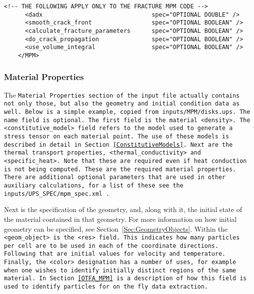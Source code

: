 \begin{Verbatim}[fontsize=\footnotesize]
      <!-- THE FOLLOWING APPLY ONLY TO THE FRACTURE MPM CODE -->
      <dadx                               spec="OPTIONAL DOUBLE" />
      <smooth_crack_front                 spec="OPTIONAL BOOLEAN" />
      <calculate_fracture_parameters      spec="OPTIONAL BOOLEAN" />
      <do_crack_propagation               spec="OPTIONAL BOOLEAN" />
      <use_volume_integral                spec="OPTIONAL BOOLEAN" />
    </MPM>
\end{Verbatim}



\subsubsection{Material Properties} \label{Sec:mat_props}

The \tt Material Properties \normalfont section of the input file
actually contains not only those, but also the geometry and initial
condition data as well.  Below is a simple example, copied from
\tt inputs/MPM/disks.ups. \normalfont  The \tt name \normalfont field
is optional.  The first field is the material \tt <density>. \normalfont
The \tt <constitutive\_model> \normalfont field refers
to the model used to generate a stress tensor on each material point.
The use of these models is described in detail in
Section~\ref{ConstitutiveModels}.  Next are the thermal transport properties,
\tt <thermal\_conductivity> \normalfont and 
\tt <specific\_heat>. \normalfont  Note that these are required even if
heat conduction is not being computed.  These are the required material
properties.  There are additional optional parameters that are used in
other auxiliary calculations, for a list of these
see the \tt inputs/UPS\_SPEC/mpm\_spec.xml \normalfont.

Next is the specification of the geometry, and, along with it, the initial
state of the material contained in that geometry.  For more information on
how initial geometry can be specified, see Section~\ref{Sec:GeometryObjects}.  Within the
\tt <geom\_object> \normalfont is the \tt <res> \normalfont field.  This
indicates how many particles per cell are to be used in each of the 
coordinate directions.  Following that are initial values for velocity and
temperature.  Finally, the \tt <color> \normalfont designation has a number
of uses, for example when one wishes to identify initially distinct regions
of the same material.  In Section~\ref{OTFA_MPM} is a description of how
this field is used to identify particles for on the fly data extraction.

